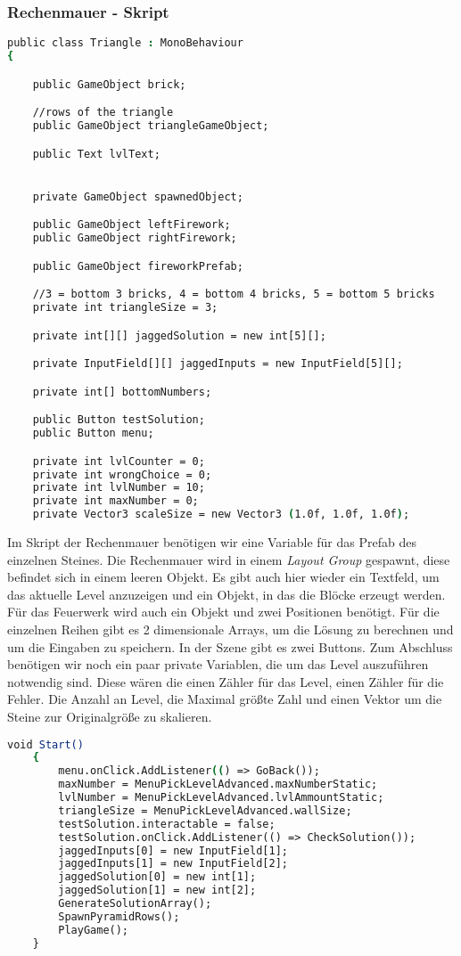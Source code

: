 \subsubsection{Rechenmauer - Skript}
\begin{lstlisting}[language=csh, caption={Triangle.cs Variablen Deklaration}]
public class Triangle : MonoBehaviour
{

	public GameObject brick;

	//rows of the triangle
	public GameObject triangleGameObject;

	public Text lvlText;


	private GameObject spawnedObject;

	public GameObject leftFirework;
	public GameObject rightFirework;

	public GameObject fireworkPrefab;

	//3 = bottom 3 bricks, 4 = bottom 4 bricks, 5 = bottom 5 bricks
	private int triangleSize = 3;

	private int[][] jaggedSolution = new int[5][];

	private InputField[][] jaggedInputs = new InputField[5][];

	private int[] bottomNumbers;

	public Button testSolution;
	public Button menu;

	private int lvlCounter = 0;
	private int wrongChoice = 0;
	private int lvlNumber = 10;
	private int maxNumber = 0;
	private Vector3 scaleSize = new Vector3 (1.0f, 1.0f, 1.0f);
\end{lstlisting}
Im Skript der Rechenmauer benötigen wir eine Variable für das Prefab des einzelnen Steines. Die Rechenmauer wird in einem \textit{Layout Group} gespawnt, diese befindet sich in einem leeren Objekt. Es gibt auch hier wieder ein Textfeld, um das aktuelle Level anzuzeigen und ein Objekt, in das die Blöcke erzeugt werden. Für das Feuerwerk wird auch ein Objekt und zwei Positionen benötigt. Für die einzelnen Reihen gibt es 2 dimensionale Arrays, um die Lösung zu berechnen und um die Eingaben zu speichern. In der Szene gibt es zwei Buttons. Zum Abschluss benötigen wir noch ein paar private Variablen, die um das Level auszuführen notwendig sind. Diese wären die einen Zähler für das Level, einen Zähler für die Fehler. Die Anzahl an Level, die Maximal größte Zahl und einen Vektor um die Steine zur Originalgröße zu skalieren.\\
\begin{lstlisting}[language=csh, caption={Triangle.cs Start-Funktion}]
	void Start()
	{
		menu.onClick.AddListener(() => GoBack());
		maxNumber = MenuPickLevelAdvanced.maxNumberStatic;
		lvlNumber = MenuPickLevelAdvanced.lvlAmmountStatic;
		triangleSize = MenuPickLevelAdvanced.wallSize;
		testSolution.interactable = false;
		testSolution.onClick.AddListener(() => CheckSolution());
		jaggedInputs[0] = new InputField[1];
		jaggedInputs[1] = new InputField[2];
		jaggedSolution[0] = new int[1];
		jaggedSolution[1] = new int[2];
		GenerateSolutionArray();
		SpawnPyramidRows();
		PlayGame();
	}
\end{lstlisting}
